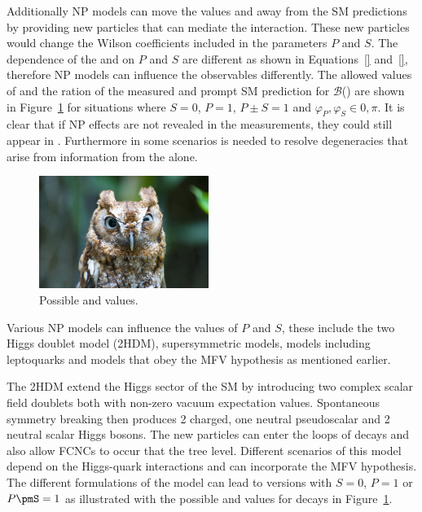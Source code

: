 Additionally NP models can move the \BF values and \ADG away from the SM predictions by providing new particles that can mediate the interaction. These new particles would change the Wilson coefficients included in the parameters $P$ and $S$. The dependence of the \BFs and \ADG on $P$ and $S$ are different as shown in Equations~\ref{} and~\ref{}, therefore NP models can influence the observables differently. The allowed values of \ADG and the ration of the measured and prompt SM prediction for $\mathcal{B}$(\bsmumu) are shown in Figure~\ref{fig:NPmodels} for situations where $S=0$, $P=1$, $P\pm S = 1$ and $\varphi_P, \varphi_S \in {0, \pi}$. It is clear that if NP effects are not revealed in the \BF measurements, they could still appear in \ADG. Furthermore in some scenarios \ADG is needed to resolve degeneracies that arise from information from the \BF alone.
\begin{figure}[htbp]
    \centering
        \includegraphics[width=0.49\textwidth]{./Figs/placeholder.jpeg}
    \caption{Possible \BF and \ADG values.}
    \label{fig:NPmodels}
\end{figure}
Various NP models can influence the values of $P$ and $S$, these include the two Higgs doublet model (2HDM), supersymmetric models, models including leptoquarks and models that obey the MFV hypothesis as mentioned earlier.

The 2HDM extend the Higgs sector of the SM by introducing two complex scalar field doublets both with non-zero vacuum expectation values. Spontaneous symmetry breaking then produces 2 charged, one neutral pseudoscalar and 2 neutral scalar Higgs bosons. The new particles can enter the loops of \bmumu decays and also allow FCNCs to occur that the tree level. Different scenarios of this model depend on the Higgs-quark interactions and can incorporate the MFV hypothesis. The different formulations of the model can lead to versions with $S=0$, $P=1$ or $P\pmS = 1$ as illustrated with the possible \BF and \ADG values for \bsmumu decays in Figure~\ref{fig:NPmodels}.

